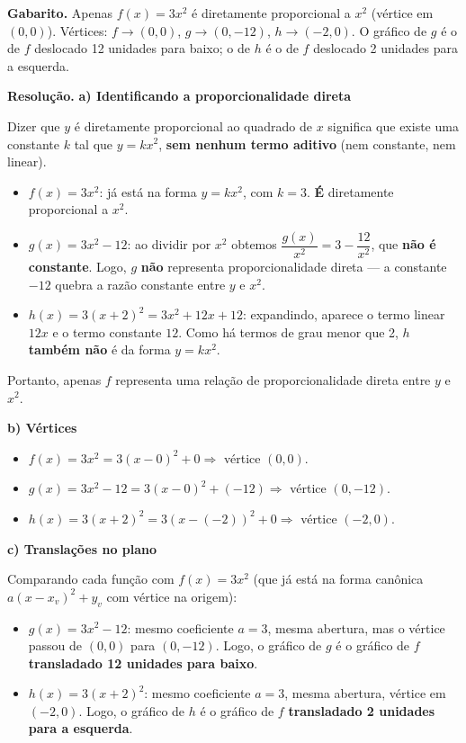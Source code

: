 \documentclass[11pt,a4paper]{article}
\begin{document}
\textbf{Gabarito.} Apenas $f(x)=3x^2$ é diretamente proporcional a $x^2$ (vértice em $(0,0)$). Vértices: $f\to(0,0)$, $g\to(0,-12)$, $h\to(-2,0)$. O gráfico de $g$ é o de $f$ deslocado 12 unidades para baixo; o de $h$ é o de $f$ deslocado 2 unidades para a esquerda.

\textbf{Resolução.} \textbf{a) Identificando a proporcionalidade direta}

Dizer que $y$ é diretamente proporcional ao quadrado de $x$ significa que existe uma constante $k$ tal que $y = kx^2$, \textbf{sem nenhum termo aditivo} (nem constante, nem linear).

\begin{itemize}[nosep,leftmargin=*]
\item $f(x) = 3x^2$: já está na forma $y = kx^2$, com $k=3$. \textbf{É} diretamente proporcional a $x^2$.
\item $g(x) = 3x^2 - 12$: ao dividir por $x^2$ obtemos $\dfrac{g(x)}{x^2} = 3 - \dfrac{12}{x^2}$, que \textbf{não é constante}. Logo, $g$ \textbf{não} representa proporcionalidade direta — a constante $-12$ quebra a razão constante entre $y$ e $x^2$.
\item $h(x) = 3(x+2)^2 = 3x^2 + 12x + 12$: expandindo, aparece o termo linear $12x$ e o termo constante $12$. Como há termos de grau menor que 2, $h$ \textbf{também não} é da forma $y=kx^2$.
\end{itemize}

Portanto, apenas $f$ representa uma relação de proporcionalidade direta entre $y$ e $x^2$.

\textbf{b) Vértices}

\begin{itemize}[nosep,leftmargin=*]
\item $f(x) = 3x^2 = 3(x-0)^2 + 0 \Rightarrow$ vértice $(0,0)$.
\item $g(x) = 3x^2 - 12 = 3(x-0)^2 + (-12) \Rightarrow$ vértice $(0,-12)$.
\item $h(x) = 3(x+2)^2 = 3(x-(-2))^2 + 0 \Rightarrow$ vértice $(-2,0)$.
\end{itemize}

\textbf{c) Translações no plano}

Comparando cada função com $f(x)=3x^2$ (que já está na forma canônica $a(x-x_v)^2+y_v$ com vértice na origem):

\begin{itemize}[nosep,leftmargin=*]
\item $g(x) = 3x^2 - 12$: mesmo coeficiente $a=3$, mesma abertura, mas o vértice passou de $(0,0)$ para $(0,-12)$. Logo, o gráfico de $g$ é o gráfico de $f$ \textbf{transladado 12 unidades para baixo}.
\item $h(x) = 3(x+2)^2$: mesmo coeficiente $a=3$, mesma abertura, vértice em $(-2,0)$. Logo, o gráfico de $h$ é o gráfico de $f$ \textbf{transladado 2 unidades para a esquerda}.
\end{itemize}
\end{document}
